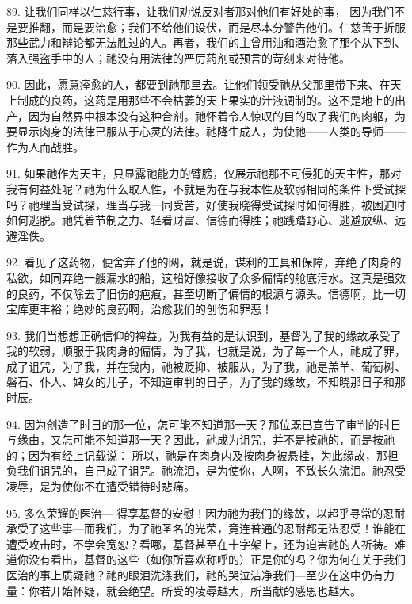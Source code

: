 89. 让我们同样以仁慈行事，让我们劝说反对者那对他们有好处的事， 因为我们不是要推翻，而是要治愈；我们不给他们设伏，而是尽本分警告他们。仁慈善于折服那些武力和辩论都无法胜过的人。再者，我们的主曾用油和酒治愈了那个从下到、落入强盗手中的人；祂没有用法律的严厉药剂或预言的苛刻来对待他。\par

90. 因此，愿意痊愈的人，都要到祂那里去。让他们领受祂从父那里带下来、在天上制成的良药，这药是用那些不会枯萎的天上果实的汁液调制的。这不是地上的出产，因为自然界中根本没有这种合剂。祂怀着令人惊叹的目的取了我们的肉躯，为要显示肉身的法律已服从于心灵的法律。祂降生成人，为使祂——人类的导师——作为人而战胜。\par

91. 如果祂作为天主，只显露祂能力的臂膀，仅展示祂那不可侵犯的天主性，那对我有何益处呢？祂为什么取人性，不就是为在与我本性及软弱相同的条件下受试探吗？祂理当受试探，理当与我一同受苦，好使我晓得受试探时如何得胜，被困迫时如何逃脱。祂凭着节制之力、轻看财富、信德而得胜；祂践踏野心、逃避放纵、远避淫佚。\par

92. 看见了这药物，便舍弃了他的网，就是说，谋利的工具和保障，弃绝了肉身的私欲，如同弃绝一艘漏水的船，这船好像接收了众多偏情的舱底污水。这真是强效的良药，不仅除去了旧伤的疤痕，甚至切断了偏情的根源与源头。信德啊，比一切宝库更丰裕；绝妙的良药啊，治愈我们的创伤和罪恶！\par

93. 我们当想想正确信仰的裨益。为我有益的是认识到，基督为了我的缘故承受了我的软弱，顺服于我肉身的偏情，为了我，也就是说，为了每一个人，祂成了罪，成了诅咒，为了我，并在我内，祂被贬抑、被服从，为了我，祂是羔羊、葡萄树、磐石、仆人、婢女的儿子，不知道审判的日子，为了我的缘故，不知晓那日子和那时辰。\par

94. 因为创造了时日的那一位，怎可能不知道那一天？那位既已宣告了审判的时日与缘由，又怎可能不知道那一天？因此，祂成为诅咒，并不是按祂的，而是按祂的；因为有经上记载说： 所以，祂是在肉身内及按肉身被悬挂，为此缘故，那担负我们诅咒的，自己成了诅咒。祂流泪，是为使你，人啊，不致长久流泪。祂忍受凌辱，是为使你不在遭受错待时悲痛。\par

95. 多么荣耀的医治--- 得享基督的安慰！因为祂为我们的缘故，以超乎寻常的忍耐承受了这些事---而我们，为了祂圣名的光荣，竟连普通的忍耐都无法忍受！谁能在遭受攻击时，不学会宽恕？看哪，基督甚至在十字架上，还为迫害祂的人祈祷。难道你没有看出，基督的这些（如你所喜欢称呼的）正是你的吗？你为何在关于我们医治的事上质疑祂？祂的眼泪洗涤我们，祂的哭泣洁净我们---至少在这中仍有力量：你若开始怀疑，就会绝望。所受的凌辱越大，所当献的感恩也越大。\par

